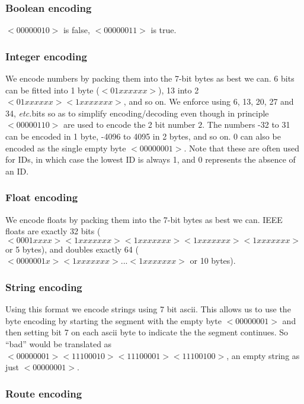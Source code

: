 \documentclass[pdftex,a4paper]{article}
\newcommand{\etc}{{\it etc.}}
\begin{document}
\subsubsection{Boolean encoding}

$<00000010>$ is false, $<00000011>$ is true.

\subsubsection{Integer encoding}

We encode numbers by packing them into the 7-bit bytes as best we
can. 6 bits can be fitted into 1 byte ($<01xxxxxx>$), 13 into 2
$<01xxxxxx> <1xxxxxxx>$, and so on. We enforce using 6, 13, 20, 27 and
34, \etc bits so as to simplify encoding/decoding even though in
principle $<00000110>$ are used to encode the 2 bit number $2$. The
numbers -32 to 31 can be encoded in 1 byte, -4096 to 4095 in 2 bytes,
and so on. 0 can also be encoded as the single empty byte
$<00000001>$. Note that these are often used for IDs, in which case
the lowest ID is always 1, and 0 represents the absence of an ID.

\subsubsection{Float encoding}

We encode floats by packing them into the 7-bit bytes as best we
can. IEEE floats are exactly 32 bits ($<0001xxxx> <1xxxxxxx>
<1xxxxxxx> <1xxxxxxx> <1xxxxxxx>$ or 5 bytes), and doubles exactly 64
($<0000001x> <1xxxxxxx> ... <1xxxxxxx>$ or 10 bytes).

\subsubsection{String encoding}

Using this format we encode strings using 7 bit ascii. This allows us
to use the byte encoding by starting the segment with the empty byte
$<00000001>$ and then setting bit 7 on each ascii byte to indicate the
the segment continues. So ``bad'' would be translated as $<00000001>
<11100010> <11100001> <11100100>$, an empty string as just $<00000001>$.

\subsubsection{Route encoding}
\label{sec:bmf_route}
\end{document}
